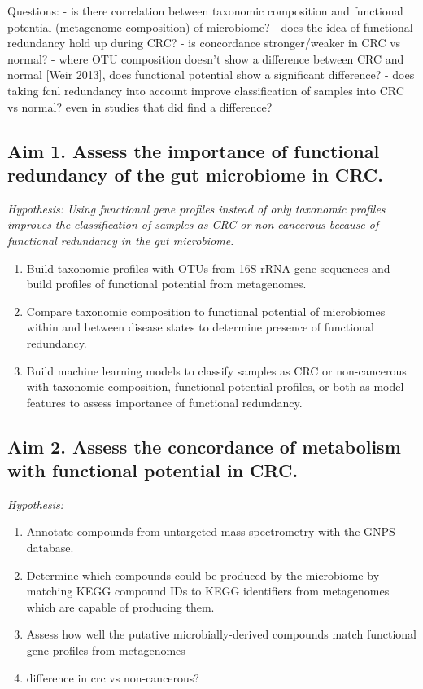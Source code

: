 \documentclass[12pt]{article}
\begin{document}
Questions:
- is there correlation between taxonomic composition and functional potential (metagenome composition) of microbiome?
- does the idea of functional redundancy hold up during CRC?
- is concordance stronger/weaker in CRC vs normal?
- where OTU composition doesn't show a difference between CRC and normal [Weir 2013], does functional potential show a significant difference?
- does taking fcnl redundancy into account improve classification of samples into CRC vs normal? even in studies that did find a difference?

\subsection*{Aim 1. Assess the importance of functional redundancy of the gut microbiome in CRC.}
\textit{Hypothesis: Using functional gene profiles instead of only taxonomic profiles improves the classification of samples as CRC or non-cancerous because of functional redundancy in the gut microbiome.}
\begin{enumerate}
    \item Build taxonomic profiles with OTUs from 16S rRNA gene sequences and build profiles of functional potential from metagenomes.
    \item Compare taxonomic composition to functional potential of microbiomes within and between disease states to determine presence of functional redundancy.
    \item Build machine learning models to classify samples as CRC or non-cancerous with taxonomic composition, functional potential profiles, or both as model features to assess importance of functional redundancy.
\end{enumerate}

\subsection*{Aim 2. Assess the concordance of metabolism with functional potential in CRC.}
\textit{Hypothesis: }
\begin{enumerate}
    \item Annotate compounds from untargeted mass spectrometry with the GNPS database.
    \item Determine which compounds could be produced by the microbiome by matching KEGG compound IDs to KEGG identifiers from metagenomes which are capable of producing them.
    \item Assess how well the putative microbially-derived compounds match functional gene profiles from metagenomes
    \item difference in crc vs non-cancerous?
\end{enumerate}
\end{document}
